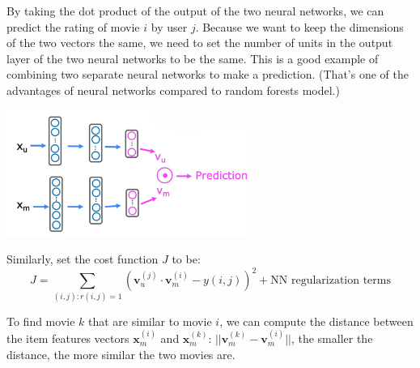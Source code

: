 By taking the dot product of the output of the two neural networks, we can predict the rating of movie $i$ by user $j$.
Because we want to keep the dimensions of the two vectors the same, 
we need to set the number of units in the output layer of the two neural networks to be the same.
This is a good example of combining two separate neural networks to make a prediction. (That's one of the 
advantages of neural networks compared to random forests model.)\\
\begin{center}
    \includegraphics*[width=0.6\textwidth]{images/16.3}
\end{center}

Similarly, set the cost function $J$ to be:
\begin{equation*}
    J = \sum_{(i, j): r(i, j) = 1} \left( \mathbf{v}_{u}^{(j)} \cdot \mathbf{v}_m^{(i)} - y(i, j) \right)^2 + \text{NN regularization terms}
\end{equation*}

To find movie $k$ that are similar to movie $i$, we can compute the distance between the item features vectors $\mathbf{x}_{m}^{(i)}$ and $\mathbf{x}_{m}^{(k)}$:
$||\mathbf{v}_{m}^{(k)} - \mathbf{v}_{m}^{(i)}||$, the smaller the distance, the more similar the two movies are.

